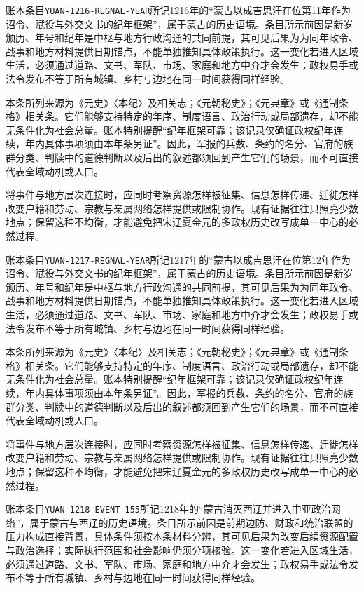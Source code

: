 账本条目\texttt{YUAN-1216-REGNAL-YEAR}所记1216年的“蒙古以成吉思汗在位第11年作为诏令、赋役与外交文书的纪年框架”，属于蒙古的历史语境。条目所示前因是新岁颁历、年号和纪年是中枢与地方行政沟通的共同前提，其可见后果为为同年政令、战事和地方材料提供日期锚点，不能单独推知具体政策执行。这一变化若进入区域生活，必须通过道路、文书、军队、市场、家庭和地方中介才会发生；政权易手或法令发布不等于所有城镇、乡村与边地在同一时间获得同样经验。

本条所列来源为《元史》〈本纪〉及相关志；《元朝秘史》；《元典章》或《通制条格》相关条。它们能够支持特定的年序、制度语言、政治行动或局部遗存，却不能无条件化为社会总量。账本特别提醒“纪年框架可靠；该记录仅确证政权纪年连续，年内具体事项须由本年条另证”。因此，军报的兵数、条约的名分、官府的族群分类、判牍中的道德判断以及后出的叙述都须回到产生它们的场景，而不可直接代表全域动机或人口。

将事件与地方层次连接时，应同时考察资源怎样被征集、信息怎样传递、迁徙怎样改变户籍和劳动、宗教与亲属网络怎样提供或限制协作。现有证据往往只照亮少数地点；保留这种不均衡，才能避免把宋辽夏金元的多政权历史改写成单一中心的必然过程。

账本条目\texttt{YUAN-1217-REGNAL-YEAR}所记1217年的“蒙古以成吉思汗在位第12年作为诏令、赋役与外交文书的纪年框架”，属于蒙古的历史语境。条目所示前因是新岁颁历、年号和纪年是中枢与地方行政沟通的共同前提，其可见后果为为同年政令、战事和地方材料提供日期锚点，不能单独推知具体政策执行。这一变化若进入区域生活，必须通过道路、文书、军队、市场、家庭和地方中介才会发生；政权易手或法令发布不等于所有城镇、乡村与边地在同一时间获得同样经验。

本条所列来源为《元史》〈本纪〉及相关志；《元朝秘史》；《元典章》或《通制条格》相关条。它们能够支持特定的年序、制度语言、政治行动或局部遗存，却不能无条件化为社会总量。账本特别提醒“纪年框架可靠；该记录仅确证政权纪年连续，年内具体事项须由本年条另证”。因此，军报的兵数、条约的名分、官府的族群分类、判牍中的道德判断以及后出的叙述都须回到产生它们的场景，而不可直接代表全域动机或人口。

将事件与地方层次连接时，应同时考察资源怎样被征集、信息怎样传递、迁徙怎样改变户籍和劳动、宗教与亲属网络怎样提供或限制协作。现有证据往往只照亮少数地点；保留这种不均衡，才能避免把宋辽夏金元的多政权历史改写成单一中心的必然过程。

账本条目\texttt{YUAN-1218-EVENT-155}所记1218年的“蒙古消灭西辽并进入中亚政治网络”，属于蒙古与西辽的历史语境。条目所示前因是前期边防、财政和统治联盟的压力构成直接背景，具体条件须按本条材料分辨，其可见后果为改变后续资源配置与政治选择；实际执行范围和社会影响仍须分项核验。这一变化若进入区域生活，必须通过道路、文书、军队、市场、家庭和地方中介才会发生；政权易手或法令发布不等于所有城镇、乡村与边地在同一时间获得同样经验。

